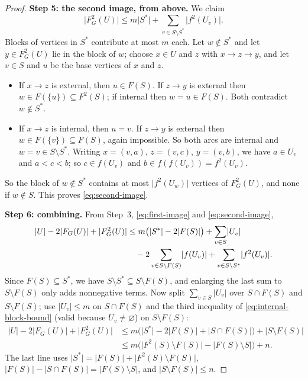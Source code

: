 \documentclass[11pt]{article}
\theoremstyle{remark}
\newcommand{\abs}[1]{\lvert #1\rvert}
\newcommand{\Step}[1]{\par\medskip\noindent\textbf{#1}\enspace}
\begin{document}
\begin{proof}
\Step{Step 5: the second image, from above.}
We claim
\begin{equation}\label{eq:second-image}
  \abs{F_G^2(U)}\le m\abs{S^{*}}
     +\sum_{v\in S\setminus S^{*}}\abs{f^2(U_v)}.
\end{equation}
Blocks of vertices in $S^{*}$ contribute at most $m$ each. Let
$w\notin S^{*}$ and let $y\in F_G^2(U)$ lie in the block of $w$; choose
$x\in U$ and $z$ with $x\to z\to y$, and let $v\in S$ and $u$ be the base
vertices of $x$ and $z$.
\begin{itemize}[leftmargin=2em]
\item If $x\to z$ is external, then $u\in F(S)$. If $z\to y$ is external
then $w\in F(\{u\})\subseteq F^2(S)$; if internal then $w=u\in F(S)$. Both
contradict $w\notin S^{*}$.
\item If $x\to z$ is internal, then $u=v$. If $z\to y$ is external then
$w\in F(\{v\})\subseteq F(S)$, again impossible. So both arcs are internal
and $w=v\in S\setminus S^{*}$. Writing $x=(v,a)$, $z=(v,c)$, $y=(v,b)$, we
have $a\in U_v$ and $a<c<b$; so $c\in f(U_v)$ and $b\in f(f(U_v))=f^2(U_v)$.
\end{itemize}
So the block of $w\notin S^{*}$ contains at most $\abs{f^2(U_w)}$ vertices of
$F_G^2(U)$, and none if $w\notin S$. This proves \eqref{eq:second-image}.

\Step{Step 6: combining.}
From Step~3, \eqref{eq:first-image} and \eqref{eq:second-image},
\begin{align}
\label{eq:blowup-sharp}
  \abs{U}-2\abs{F_G(U)}+\abs{F_G^2(U)}
  &\le m\bigl(\abs{S^{*}}-2\abs{F(S)}\bigr)
       +\sum_{v\in S}\abs{U_v} \notag\\
  &\quad -2\sum_{v\in S\setminus F(S)}\abs{f(U_v)}
       +\sum_{v\in S\setminus S^{*}}\abs{f^2(U_v)}.
\end{align}
Since $F(S)\subseteq S^{*}$, we have
$S\setminus S^{*}\subseteq S\setminus F(S)$, and enlarging the last sum to
$S\setminus F(S)$ only adds nonnegative terms. Now split
$\sum_{v\in S}\abs{U_v}$ over $S\cap F(S)$ and $S\setminus F(S)$; use
$\abs{U_v}\le m$ on $S\cap F(S)$ and the third inequality of
\eqref{eq:internal-block-bound} (valid because $U_v\ne\varnothing$) on
$S\setminus F(S)$:
\begin{align*}
  \abs{U}-2\abs{F_G(U)}+\abs{F_G^2(U)}
  &\le m\bigl(\abs{S^{*}}-2\abs{F(S)}
                    +\abs{S\cap F(S)}\bigr)
       +\abs{S\setminus F(S)}\\
  &\le m\bigl(\abs{F^2(S)\setminus F(S)}
                    -\abs{F(S)\setminus S}\bigr)+n.
\end{align*}
The last line uses $\abs{S^{*}}=\abs{F(S)}+\abs{F^2(S)\setminus F(S)}$,
$\abs{F(S)}-\abs{S\cap F(S)}=\abs{F(S)\setminus S}$, and
$\abs{S\setminus F(S)}\le n$.


\end{proof}
\end{document}

